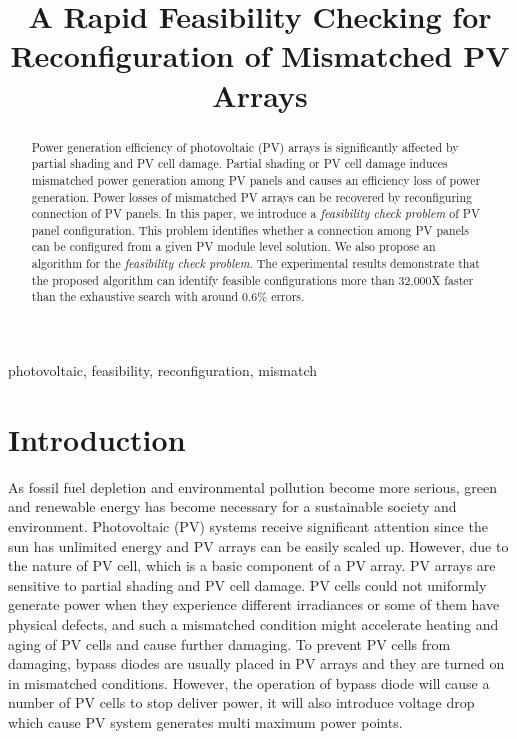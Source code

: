 \documentclass[conference]{pvsctran}
\begin{document}
\title{ A Rapid Feasibility Checking for Reconfiguration of Mismatched PV Arrays}

\author{ 
}

\setlength{\columnsep}{0.25in}


\maketitle


\begin{abstract}
  Power generation efficiency of photovoltaic (PV) arrays is significantly affected by partial shading and PV cell damage.
  Partial shading or PV cell damage induces mismatched power generation among PV panels and causes an efficiency loss of power generation.
  Power losses of mismatched PV arrays can be recovered by reconfiguring connection of PV panels.
  In this paper, we introduce a \textit{feasibility check problem} of PV panel configuration.
  This problem identifies whether a connection among PV panels can be configured from a given PV module level solution.
  We also propose an algorithm for the \textit{feasibility check problem}.
  The experimental results demonstrate that the proposed algorithm can identify feasible configurations more than 32,000X faster than the exhaustive search with around 0.6\% errors. 
\end{abstract}

\begin{IEEEkeywords}
photovoltaic, feasibility, reconfiguration, mismatch
\end{IEEEkeywords}

\IEEEpeerreviewmaketitle



\section{Introduction}
As fossil fuel depletion and environmental pollution become more serious, green and renewable energy has become necessary for a sustainable society and environment. 
Photovoltaic (PV) systems receive significant attention since the sun has unlimited energy and PV arrays can be easily scaled up. 
However, due to the nature of PV cell, which is a basic component of a PV array.
PV arrays are sensitive to partial shading and PV cell damage. 
PV cells could not uniformly generate power when they experience different irradiances or some of them have physical defects, and such a mismatched condition might accelerate heating and aging of PV cells and cause further damaging. 
To prevent PV cells from damaging, bypass diodes are usually placed in PV arrays and they are turned on in mismatched conditions. 
However,  the operation of bypass diode will cause a number of PV cells to stop deliver power, it will also introduce voltage drop which cause PV system generates multi maximum power points.
\end{document}
